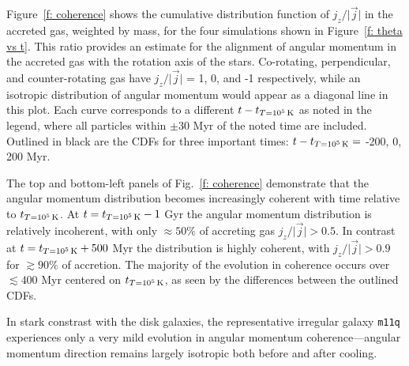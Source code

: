 \documentclass[fleqn,usenatbib]{mnras}
\newcommand{\tcon}{t_{T=10^5\,{\rm K}}}
\begin{document}
Figure~\ref{f: coherence} shows the cumulative distribution function of $j_z / \vert \vec j \vert$ in the accreted gas, weighted by mass, for the four simulations shown in Figure~\ref{f: theta vs t}. This ratio provides an estimate for the alignment of  angular momentum in the accreted gas with the rotation axis of the stars. Co-rotating, perpendicular, and counter-rotating gas have $j_z / \vert \vec j \vert$ = 1, 0, and -1 respectively, while an isotropic distribution of angular momentum would appear as a diagonal line in this plot. 
Each curve corresponds to a different $t - \tcon$ as noted in the legend, where all particles within $\pm$30 Myr of the noted time are included. 
Outlined in black are the CDFs for three important times: $t - \tcon =$ -200, 0, 200 Myr.

The top and bottom-left panels of Fig.~\ref{f: coherence} demonstrate that the angular momentum distribution becomes increasingly coherent with time relative to $\tcon$. At $t=\tcon-1$ Gyr the angular momentum distribution is relatively incoherent, with only $\approx50\%$ of accreting gas $j_z/\vert \vec j \vert > 0.5$. In contrast at $t=\tcon+500$ Myr the distribution is highly coherent, with $j_z/\vert \vec j \vert > 0.9$ for $\gtrsim 90\%$ of accretion.
The majority of the evolution in coherence occurs over $\lesssim 400$ Myr centered on $\tcon$, as seen by the differences between the outlined CDFs.

In stark constrast with the disk galaxies, the representative irregular galaxy \texttt{m11q} experiences only a very mild evolution in angular momentum coherence---angular momentum direction remains largely isotropic both before and after cooling.

\end{document}
